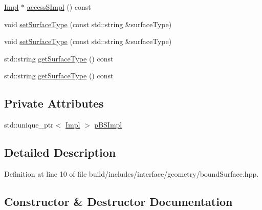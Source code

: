 \begin{DoxyCompactItemize}
\hyperlink{classMcCAD_1_1Geometry_1_1BoundSurface_1_1Impl}{Impl} $\ast$ \hyperlink{classMcCAD_1_1Geometry_1_1Surface_adafee834670eb8c97025e24ffd6df844}{access\+S\+Impl} () const
\item 
void \hyperlink{classMcCAD_1_1Geometry_1_1Surface_a976893834481e58569db0d35db2ba969}{set\+Surface\+Type} (const std\+::string \&surface\+Type)
\item 
void \hyperlink{classMcCAD_1_1Geometry_1_1Surface_a976893834481e58569db0d35db2ba969}{set\+Surface\+Type} (const std\+::string \&surface\+Type)
\item 
std\+::string \hyperlink{classMcCAD_1_1Geometry_1_1Surface_ac81308cae2d3fd458dfa311adea23688}{get\+Surface\+Type} () const
\item 
std\+::string \hyperlink{classMcCAD_1_1Geometry_1_1Surface_ac81308cae2d3fd458dfa311adea23688}{get\+Surface\+Type} () const
\end{DoxyCompactItemize}
\subsection*{Private Attributes}
\begin{DoxyCompactItemize}
\item 
std\+::unique\+\_\+ptr$<$ \hyperlink{classMcCAD_1_1Geometry_1_1BoundSurface_1_1Impl}{Impl} $>$ \hyperlink{classMcCAD_1_1Geometry_1_1BoundSurface_ae678fabb46e22b7a68a336051b366ddf}{p\+B\+S\+Impl}
\end{DoxyCompactItemize}


\subsection{Detailed Description}


Definition at line 10 of file build/includes/interface/geometry/bound\+Surface.\+hpp.



\subsection{Constructor \& Destructor Documentation}
\mbox{\label{classMcCAD_1_1Geometry_1_1BoundSurface_a50af5d5cd7cc2a92400422f57988d137}} 
